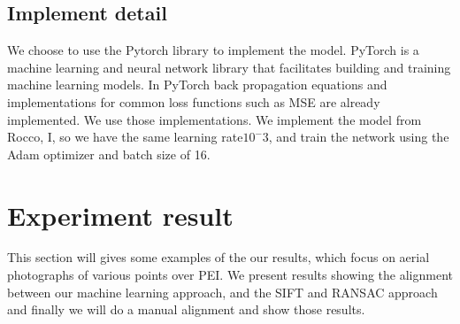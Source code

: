 \subsection{Implement detail}
  We choose to use the Pytorch\cite{pytorch} library to implement the model. PyTorch is a machine learning and neural network library that facilitates building and training machine learning models. In PyTorch back propagation equations and implementations for common loss functions such as MSE are already implemented. We use those implementations. We implement the model from Rocco, I\citep{Rocco18}, so we have the same learning rate$10^-3$, and train the network using the Adam optimizer\cite{kingma2014adam} and batch size of 16. \\

\section{Experiment result}
This section will gives some examples of the our results, which focus on aerial photographs of various points over PEI. We present results showing the alignment between our machine learning approach, and the SIFT and RANSAC approach and finally we will do a manual alignment and show those results.

